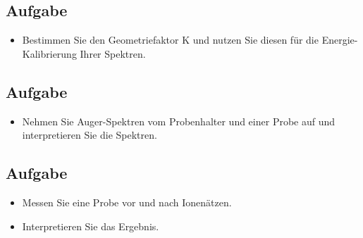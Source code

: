 
\subsection{Aufgabe} %
\label{sub:aufgabe}
	
	\begin{itemize}
		\item
			Bestimmen Sie den Geometriefaktor K und nutzen Sie diesen für die Energie-Kalibrierung Ihrer Spektren.
	\end{itemize}



\subsection{Aufgabe} %
\label{sub:aufgabe}
	
	\begin{itemize}
		\item
			Nehmen Sie Auger-Spektren vom Probenhalter und einer Probe auf und interpretieren Sie die Spektren.
	\end{itemize}



\subsection{Aufgabe} %
\label{sub:aufgabe}
	
	\begin{itemize}
		\item
			Messen Sie eine Probe vor und nach Ionenätzen.
		\item
			Interpretieren Sie das Ergebnis.
	\end{itemize}

